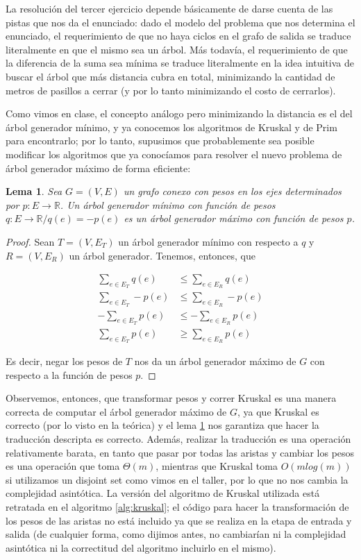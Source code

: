 \documentclass{article}
\newtheorem{lemma}{Lema}[theorem]
\theoremstyle{definition}
\theoremstyle{remark}
\begin{document}
La resolución del tercer ejercicio depende básicamente de darse cuenta de las pistas que nos da el enunciado: dado el modelo del problema que nos determina el enunciado, el requerimiento de que no haya ciclos en el grafo de salida se traduce literalmente en que el mismo sea un árbol. Más todavía, el requerimiento de que la diferencia de la suma sea mínima se traduce literalmente en la idea intuitiva de buscar el árbol que más distancia cubra en total, minimizando la cantidad de metros de pasillos a cerrar (y por lo tanto minimizando el costo de cerrarlos).

Como vimos en clase, el concepto análogo pero minimizando la distancia es el del árbol generador mínimo, y ya conocemos los algoritmos de Kruskal y de Prim para encontrarlo; por lo tanto, supusimos que probablemente sea posible modificar los algoritmos que ya conocíamos para resolver el nuevo problema de árbol generador máximo de forma eficiente:

\begin{lemma}
Sea $G = (V, E)$ un grafo conexo con pesos en los ejes determinados por $p : E \to \mathbb{R}$. Un árbol generador mínimo con función de pesos $q : E \to \mathbb{R} / q(e) = -p(e)$ es un árbol generador máximo con función de pesos $p$.
\label{pr:agm}
\end{lemma}

\begin{proof}
Sean $T = (V, E_T)$ un árbol generador mínimo con respecto a $q$ y $R = (V, E_R)$ un árbol generador. Tenemos, entonces, que

\begin{align*}
\sum_{e \in E_T} q(e) &\leq \sum_{e \in E_R} q(e)\\
\sum_{e \in E_T} -p(e) &\leq \sum_{e \in E_R} -p(e)\\
-\sum_{e \in E_T} p(e) &\leq -\sum_{e \in E_R} p(e)\\
\sum_{e \in E_T} p(e) &\geq \sum_{e \in E_R} p(e)
\end{align*}

Es decir, negar los pesos de $T$ nos da un árbol generador máximo de $G$ con respecto a la función de pesos $p$.
\end{proof}

Observemos, entonces, que transformar pesos y correr Kruskal es una manera correcta de computar el árbol generador máximo de $G$, ya que Kruskal es correcto (por lo visto en la teórica) y el lema \ref{pr:agm} nos garantiza que hacer la traducción descripta es correcto. Además, realizar la traducción es una operación relativamente barata, en tanto que pasar por todas las aristas y cambiar los pesos es una operación que toma $\Theta(m)$, mientras que Kruskal toma $O(m log(m))$ si utilizamos un disjoint set como vimos en el taller, por lo que no nos cambia la complejidad asintótica. La versión del algoritmo de Kruskal utilizada está retratada en el algoritmo \ref{alg:kruskal}; el código para hacer la transformación de los pesos de las aristas no está incluido ya que se realiza en la etapa de entrada y salida (de cualquier forma, como dijimos antes, no cambiarían ni la complejidad asintótica ni la correctitud del algoritmo incluirlo en el mismo).
\end{document}
